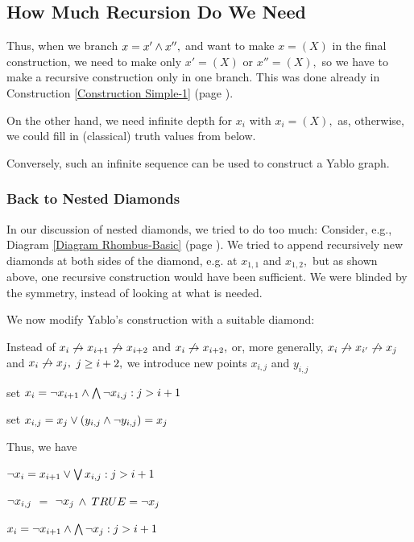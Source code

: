 \subsection{
How Much Recursion Do We Need
}


\label{Section How-Much}


Thus, when we branch $x=x' \wedge x'',$ and want to make $x=(X)$ in the
final
construction, we need to make only $x' =(X)$ or $x'' =(X),$ so we have to
make
a recursive construction only in one branch. This was done already in
Construction 
\ref{Construction Simple-1} (page 
\pageref{Construction Simple-1}).

On the other hand, we need infinite depth for $x_{i}$ with $x_{i}=(X),$
as, otherwise,
we could fill in (classical) truth values from below.

Conversely, such an infinite sequence can be used to construct a Yablo
graph.
\subsubsection{
Back to Nested Diamonds
}


In our discussion of nested diamonds, we tried to do too much:
Consider, e.g., Diagram 
\ref{Diagram Rhombus-Basic} (page 
\pageref{Diagram Rhombus-Basic}).
We tried to append recursively new diamonds at both sides of the diamond,
e.g. at $x_{1,1}$ and $x_{1,2},$ but as
shown above, one recursive construction would have been sufficient.
We were blinded by the symmetry, instead of looking at what is needed.

We now modify Yablo's construction with a suitable diamond:

Instead of $x_{i} \not\rightarrow x_{i+1} \not\rightarrow x_{i+2}$ and $x_{i} \not\rightarrow x_{i+2},$ or,
more generally,
$x_{i} \not\rightarrow x_{i' } \not\rightarrow x_{j}$ and $x_{i} \not\rightarrow x_{j},$ $j \geq i+2,$ we
 \xEh
 \xDH introduce new points $x_{i,j}$ and $y_{i,j}$

 \xDH set
$x_{i}= \neg x_{i+1} \wedge \bigwedge \neg x_{i,j}:j>i+1$

 \xDH set
$x_{i,j}=x_{j} \vee (y_{i,j} \wedge \neg y_{i,j})=x_{j}$

 \xDH
Thus, we have

$ \neg x_{i}=x_{i+1} \vee \bigvee x_{i,j}:j>i+1$

$ \neg x_{i,j}$ $=$ $ \neg x_{j}$ $ \wedge $ $TRUE= \neg x_{j}$

$x_{i}= \neg x_{i+1} \wedge \bigwedge \neg x_{j}:j>i+1$

